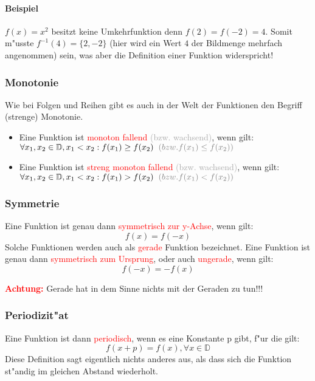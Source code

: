 \paragraph{Beispiel}
$f(x) = x^2$ besitzt keine Umkehrfunktion denn $f(2) = f(-2) = 4$. Somit m"usste $f^{-1}(4) = \{2, -2\}$ (hier wird ein Wert $4$ der Bildmenge mehrfach angenommen) sein, was aber die Definition einer Funktion widerspricht!

\subsubsection{Monotonie}
Wie bei Folgen und Reihen gibt es auch in der Welt der Funktionen den Begriff (strenge) Monotonie.\\
\begin{itemize}
\item Eine Funktion ist \textcolor{red}{monoton fallend} \textcolor{DarkGrey}{(bzw. wachsend)}, wenn gilt:\\
$\forall x_1, x_2 \in\mathbb{D}, x_1 < x_2: f(x_1)\geq f(x_2) \hspace{0.2 cm}\textcolor{DarkGrey}{(bzw. f(x_1)\leq f(x_2))}$
\item Eine Funktion ist \textcolor{red}{streng monoton fallend} \textcolor{DarkGrey}{(bzw. wachsend)}, wenn gilt:\\
$\forall x_1, x_2 \in\mathbb{D}, x_1 < x_2: f(x_1)>f(x_2) \hspace{0.2 cm}\textcolor{DarkGrey}{(bzw. f(x_1)<f(x_2))}$
\end{itemize}

\subsubsection{Symmetrie}
Eine Funktion ist genau dann \textcolor{red}{symmetrisch zur y-Achse}, wenn gilt:
\begin{equation*}
f(x)=f(-x)
\end{equation*}
Solche Funktionen werden auch als \textcolor{red}{gerade} Funktion bezeichnet. Eine Funktion ist genau dann \textcolor{red}{symmetrisch zum Ursprung}, oder auch \textcolor{red}{ungerade}, wenn gilt:
\begin{equation*}
f(-x)=-f(x)
\end{equation*}
\begin{center}
\textbf{\textcolor{red}{Achtung:}} Gerade hat in dem Sinne nichts mit der Geraden zu tun!!!
\end{center}

\subsubsection{Periodizit"at}
Eine Funktion ist dann \textcolor{red}{periodisch}, wenn es eine Konstante p gibt, f"ur die gilt:
\begin{equation*}
f(x+p) = f(x), \forall x\in\mathbb{D}
\end{equation*}
Diese Definition sagt eigentlich nichts anderes aus, als dass sich die Funktion st"andig im gleichen Abstand wiederholt.

